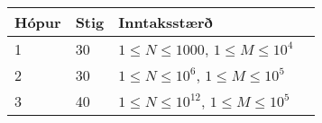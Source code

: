 \begin{tabular}{|l|l|l|l|}
\hline
Hópur & Stig & Inntaksstærð \\ \hline
1     & 30         & $ 1 \le N \le 1000$, $1 \le M \le 10^4$ \\ \hline
2     & 30         & $ 1 \le N \le 10^6$, $1 \le M \le 10^5$ \\ \hline
3     & 40         & $ 1 \le N \le 10^{12}$, $1 \le M \le 10^5$ \\ \hline
\end{tabular}
